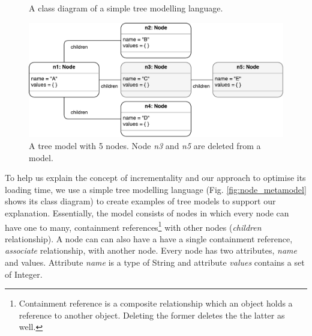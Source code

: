 \documentclass{llncs}
\begin{document}
\begin{figure}[ht]
\begin{minipage}[t]{0.39\linewidth}
    \centering
    \caption{A class diagram of a simple tree modelling language.}
    \label{fig:node_metamodel}
\end{minipage}
    \hfill
\begin{minipage}[t]{0.59\linewidth}
    \includegraphics[width=\linewidth]{initial_chart}
    \caption{A tree model with 5 nodes. Node \emph{n3} and \emph{n5} are deleted from a model.}
    \label{fig:initial_model}
\end{minipage} 
\end{figure}

To help us explain the concept of incrementality and our approach to optimise its loading time, we use a simple tree modelling language (Fig. \ref{fig:node_metamodel} shows its class diagram) to create examples of  tree models to support our explanation. Essentially, the model consists of nodes in which every node can have one to many, containment references\footnote{Containment reference is a composite relationship which an object holds a reference to another object. Deleting the former deletes the the latter as well.} with other nodes (\emph{children} relationship). A node can can also have a have a single containment reference, \emph{associate} relationship, with another node. Every node has two attributes, \emph{name} and {values}. Attribute \emph{name} is a type of String and attribute \emph{values} contains a set of Integer.
\end{document}
